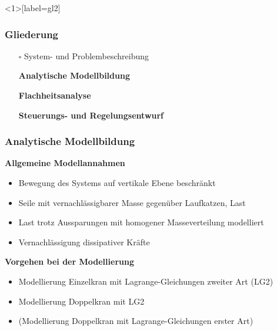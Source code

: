 \documentclass[
	ngerman,
	10pt,				%
	aspectratio=169 	%
]{beamer}
\newcommand{\cdbox}{$\square$\hspace{-0.65em}\raisebox{0.1em}{\checkmark}\hspace{-0.18em}}
\begin{document}

\begin{frame}<1>[label=gl2]
	\frametitle{Gliederung}
	\begin{itemize}
		\item[\cdbox] System- und Problembeschreibung
		\item[\only<1>{$\rightarrow$}\only<2>{$\rightarrow$}\only<3->{\cdbox}]
		\textbf<1>{Analytische Modellbildung}
		\item[\only<1>{$\square$}\only<2>{$\rightarrow$}\only<3->{\cdbox}]
		\textbf<2>{Flachheitsanalyse}
		\item[\only<1-2>{$\square$}\only<3>{$\rightarrow$}\only<4->{\cdbox}]
		\textbf<3>{Steuerungs- und Regelungsentwurf}
	\end{itemize}
\end{frame}


\begin{frame}[label=analMB]
	\frametitle{Analytische Modellbildung}
	\textbf{Allgemeine Modellannahmen}
	\begin{itemize}
		\item Bewegung des Systems auf vertikale Ebene beschränkt
		\pause
		\item Seile mit vernachlässigbarer Masse gegenüber Laufkatzen, Last
		\pause
		\item Last trotz Aussparungen mit homogener Masseverteilung modelliert
		\pause
		\item Vernachlässigung dissipativer Kräfte 
	\end{itemize}

	\pause
	\bigskip
	\textbf{Vorgehen bei der Modellierung}
	\begin{itemize}
		\item Modellierung Einzelkran mit Lagrange-Gleichungen zweiter Art (LG2)
		\pause
		\item Modellierung Doppelkran mit LG2
		\pause
		\item (Modellierung Doppelkran mit Lagrange-Gleichungen erster Art)
	\end{itemize}
\end{frame}

\end{document}
